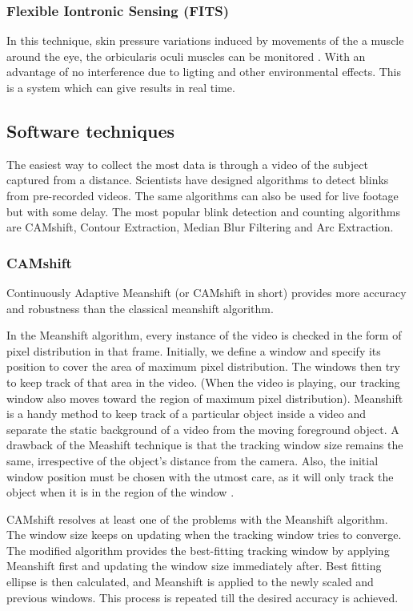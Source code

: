 \documentclass[conference]{IEEEtran}
\begin{document}
\subsubsection{Flexible Iontronic Sensing (FITS)}
In this technique,  skin pressure variations induced by movements of the a muscle around the eye, the orbicularis oculi muscles can be monitored \cite{Nih}. With an advantage of no interference due to ligting and other environmental effects. This is a system which can give results in real time. 


\subsection{Software techniques}
The easiest way to collect the most data is through a video of the subject captured from a distance. Scientists have designed algorithms to detect blinks from pre-recorded videos. The same algorithms can also be used for live footage but with some delay. The most popular blink detection and counting algorithms are CAMshift, Contour Extraction, Median Blur Filtering and Arc Extraction.

\subsubsection{CAMshift}
Continuously Adaptive Meanshift (or CAMshift in short) provides more accuracy and robustness than the classical meanshift algorithm.

In the Meanshift algorithm, every instance of the video is checked in the form of pixel distribution in that frame. Initially, we define a window and specify its position to cover the area of maximum pixel distribution. The windows then try to keep track of that area in the video. (When the video is playing, our tracking window also moves toward the region of maximum pixel distribution). Meanshift is a handy method to keep track of a particular object inside a video and separate the static background of a video from the moving foreground object. A drawback of the Meashift technique is that the tracking window size remains the same, irrespective of the object's distance from the camera. Also, the initial window position must be chosen with the utmost care, as it will only track the object when it is in the region of the window \cite{meanShift}.

CAMshift resolves at least one of the problems with the Meanshift algorithm. The window size keeps on updating when the tracking window tries to converge. The modified algorithm provides the best-fitting tracking window by applying Meanshift first and updating the window size immediately after. Best fitting ellipse is then calculated, and Meanshift is applied to the newly scaled and previous windows. This process is repeated till the desired accuracy is achieved.
\end{document}
